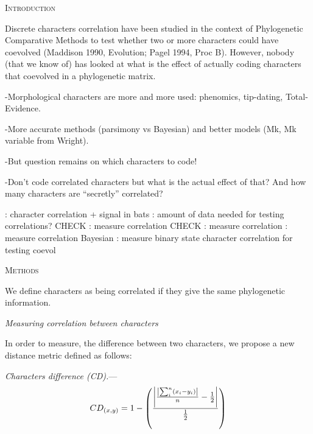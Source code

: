 \documentclass[12pt,letterpaper]{article}
\DeclarePairedDelimiter\abs{\lvert}{\rvert}%
\renewcommand{\section}[1]{%
\bigskip
\begin{center}
\begin{Large}
\normalfont\scshape #1
\medskip
\end{Large}
\end{center}}
\renewcommand{\subsection}[1]{%
\bigskip
\begin{center}
\begin{large}
\normalfont\itshape #1
\end{large}
\end{center}}
\renewcommand{\subsubsection}[1]{%
\vspace{2ex}
\noindent
\textit{#1.}---}
\begin{document}
\section{Introduction}

Discrete characters correlation have been studied in the context of Phylogenetic Comparative Methods to test whether two or more characters could have coevolved (Maddison 1990, Evolution; Pagel 1994, Proc B).
However, nobody (that we know of) has looked at what is the effect of actually coding characters that coevolved in a phylogenetic matrix.



-Morphological characters are more and more used: phenomics, tip-dating, Total-Evidence.

-More accurate methods (parsimony vs Bayesian) and better models (Mk, Mk variable from Wright).

-But question remains on which characters to code!

-Don't code correlated characters but what is the actual effect of that? And how many characters are ``secretly'' correlated?

\cite{Davalos01072014}: character correlation + signal in bats
\cite{Grabowski2016}: amount of data needed for testing correlations? CHECK
\cite{Lande1983}: measure correlation CHECK
\cite{Pagel1994}: measure correlation
\cite{Pagel2006}: measure correlation Bayesian
\cite{Maddison1990}: measure binary state character correlation for testing coevol

\section{Methods}

We define characters as being correlated if they give the same phylogenetic information.

\subsection{Measuring correlation between characters}

In order to measure, the difference between two characters, we propose a new distance metric defined as follows:

\subsubsection{Characters difference (CD)}
\begin{equation}
    CD_{(x,y)} = 1 - \left(\frac{\abs*{\frac{\abs*{\sum_{i}^{n}(x_{i} - y_{i})}}{n}-\frac{1}{2}}}{\frac{1}{2}}\right)
\end{equation}
\end{document}
